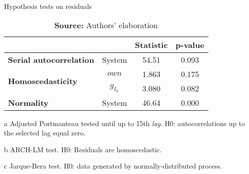 \begin{table}[H]
\centering
\caption{Hypothesis tests on residuals}
\label{testes_resduos}
	\begin{threeparttable}
\begin{tabular}{l|c|c|c}
\hline
\multicolumn{2}{l|}{} & \textbf{Statistic} & \textbf{p-value} \\ \hline
\textbf{Serial autocorrelation}\tnote{a} & System & 54.51 & 0.093 \\ \hline
\multirow{2}{*}{\textbf{Homoscedasticity}\tnote{b}} & $own$ & 1.863 & 0.175 \\ \cline{2-4} 
 & $g_{I_h}$ & 3.080 & 0.082 \\ \hline
\textbf{Normality}\tnote{c} & System & 46.64 & 0.000 \\ \hline
\end{tabular}%
\begin{tablenotes}\footnotesize
	\item [a] Adjusted Portmanteau tested until up to 15th \textit{lag}. H0: autocorrelations up to the selected lag equal zero.
	\item [b] ARCH-LM test. H0: Residuals are homoscedastic.
	\item [c] Jarque-Bera test. H0: data generated by normally-distributed process.
\end{tablenotes}
\end{threeparttable}
\caption*{\textbf{Source:} Authors' elaboration}
\end{table}
